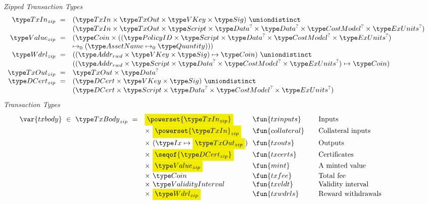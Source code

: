 \begin{property}
\begin{figure*}[htb]
  \emph{Zipped Transaction Types}
  \begin{equation*}
    \begin{array}{r@{~~}l@{~~}l@{\qquad}l}
      \TxIn_{zip} ~=~&
       (\TxIn \times \TxOut \times \VKey \times \Sig)  ~\uniondistinct \\
       & (\TxIn \times \TxOut \times \Script \times \Data^? \times \Data^? \times \CostMod^? \times \ExUnits^?)\\
      \Value_{zip} ~=~&
      (\Coin \times ((\PolicyID \times \Script \times \Data^? \times \CostMod^? \times \ExUnits^?) \\
      & \mapsto_0 (\AssetName \mapsto_0 \Quantity))) \\
      \Wdrl_{zip} ~=~& ((\AddrRWD \times \VKey \times \Sig) \mapsto \Coin) ~ \uniondistinct \\
      & ((\AddrRWD \times \Script \times \Data^? \times \CostMod^? \times \ExUnits^?) \mapsto \Coin) \\
      \TxOut_{zip}~=~& \TxOut \times \Data^? \\
      \DCert_{zip}~=~& (\DCert \times \VKey \times \Sig) ~ \uniondistinct \\
      & (\DCert \times \Script \times \Data^? \times \CostMod^? \times \ExUnits^?)
    \end{array}
  \end{equation*}
  \emph{Transaction Types}
  \begin{equation*}
    \begin{array}{r@{~~}l@{~~}l@{\qquad}l}
      \var{txbody} ~\in~ \TxBody_{zip}~=~
      & \hldiff{\powerset{\TxIn_{zip}}} & \fun{txinputs}& \text{Inputs}\\
      & \times ~\hldiff{\powerset{\TxIn}_{zip}} & \fun{collateral} & \text{Collateral inputs}\\
      & \times ~(\Ix \mapsto \hldiff{\TxOut_{zip}}) & \fun{txouts}& \text{Outputs}\\
      & \times~ \hldiff{\seqof{\DCert_{zip}}} & \fun{txcerts}& \text{Certificates}\\
       & \times ~\hldiff{\Value_{zip}}  & \fun{mint} &\text{A minted value}\\
       & \times ~\Coin & \fun{txfee} &\text{Total fee}\\
       & \times ~\ValidityInterval & \fun{txvldt} & \text{Validity interval}\\
       & \times~ \hldiff{\Wdrl_{zip}}  & \fun{txwdrls} &\text{Reward withdrawals}\\

\end{array}
\end{equation*}
\end{figure*}
\end{property}
